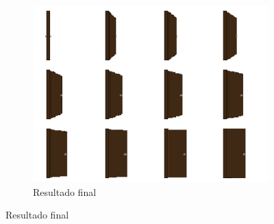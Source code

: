 \begin{figure}[htbp]
\begin{subfigure}{0.5\linewidth}
        \includegraphics[width=1\linewidth]{figs/pixelLab/final/side_door_pixel_correcao_pixel_cor.png}
        \caption{\small Resultado final}
        \label{fig:pixelLabFinalSideViewGemini2}
    \end{subfigure}

\end{figure}